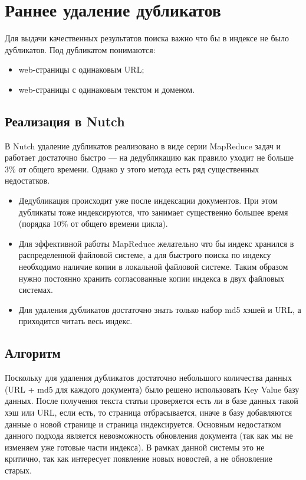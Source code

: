 \section{Раннее удаление дубликатов}
Для выдачи качественных результатов поиска важно что бы в индексе не было дубликатов. Под дубликатом понимаются:
\begin{itemize}
 \item web-страницы с одинаковым URL;
 \item web-страницы с одинаковым текстом и доменом. 
\end{itemize}
\subsection{Реализация в Nutch}
В Nutch удаление дубликатов реализовано в виде серии MapReduce задач и работает достаточно быстро --- на дедубликацию как правило уходит не больше 3\% от общего времени. Однако у этого метода есть ряд существенных недостатков.
\begin{itemize}
 \item Дедубликация происходит уже после индексации документов. При этом дубликаты тоже индексируются, что занимает существенно большее время (порядка 10\% от общего времени цикла).
 \item Для эффективной работы MapReduce желательно что бы индекс хранился в распределенной файловой системе, а для быстрого поиска по индексу необходимо наличие копии в локальной файловой системе. Таким образом  нужно постоянно хранить согласованные копии индекса в двух файловых системах.
 \item Для удаления дубликатов достаточно знать только набор md5 хэшей и URL, а приходится читать весь индекс.
\end{itemize}
\subsection{Алгоритм}
Поскольку для удаления дубликатов достаточно небольшого количества данных (URL + md5 для каждого документа) было решено использовать Key Value базу данных. После получения текста статьи проверяется есть ли в базе данных такой хэш или URL, если есть, то страница отбрасывается, иначе в базу добавляются данные о новой странице и страница индексируется. Основным недостатком данного подхода является невозможность обновления документа (так как мы не изменяем уже готовые части индекса). В рамках данной системы это не критично, так как интересует появление новых новостей, а не обновление старых.

